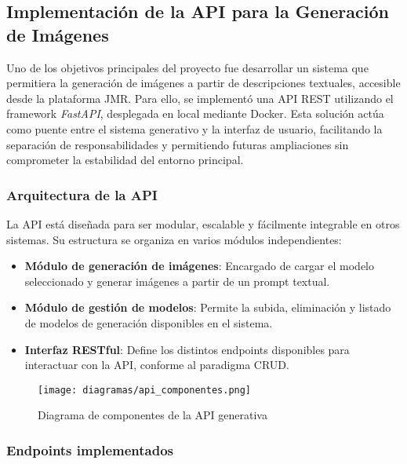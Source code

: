\subsection{Implementación de la API para la Generación de Imágenes}

Uno de los objetivos principales del proyecto fue desarrollar un sistema que permitiera la generación de imágenes a partir de descripciones textuales, accesible desde la plataforma JMR. Para ello, se implementó una API REST utilizando el framework \textit{FastAPI}, desplegada en local mediante Docker. Esta solución actúa como puente entre el sistema generativo y la interfaz de usuario, facilitando la separación de responsabilidades y permitiendo futuras ampliaciones sin comprometer la estabilidad del entorno principal.

\subsubsection{Arquitectura de la API}

La API está diseñada para ser modular, escalable y fácilmente integrable en otros sistemas. Su estructura se organiza en varios módulos independientes:

\begin{itemize}
\item \textbf{Módulo de generación de imágenes}: Encargado de cargar el modelo seleccionado y generar imágenes a partir de un prompt textual.
\item \textbf{Módulo de gestión de modelos}: Permite la subida, eliminación y listado de modelos de generación disponibles en el sistema.
\item \textbf{Interfaz RESTful}: Define los distintos endpoints disponibles para interactuar con la API, conforme al paradigma CRUD.
\end{itemize}

\begin{figure}[H]
\centering
\texttt{[image: diagramas/api\_componentes.png]}
\caption{Diagrama de componentes de la API generativa}
\label{fig:api-componentes}
\end{figure}

\subsubsection{Endpoints implementados} 
